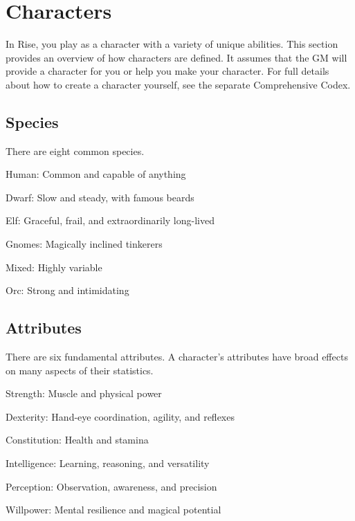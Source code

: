 \chapter{Characters}\label{Characters}

In Rise, you play as a character with a variety of unique abilities.
This section provides an overview of how characters are defined.
It assumes that the GM will provide a character for you or help you make your character.
For full details about how to create a character yourself, see the separate Comprehensive Codex.

\section{Species}
  There are eight common species.
  \begin{raggeditemize}
    \item Human: Common and capable of anything
    \item Dwarf: Slow and steady, with famous beards
    \item Elf: Graceful, frail, and extraordinarily long-lived
    \item Gnomes: Magically inclined tinkerers
    \item Mixed: Highly variable
    \item Orc: Strong and intimidating
  \end{raggeditemize}

\section{Attributes}
  There are six fundamental attributes.
  A character's attributes have broad effects on many aspects of their statistics.
  \begin{raggeditemize}
    \item Strength: Muscle and physical power
    \item Dexterity: Hand-eye coordination, agility, and reflexes
    \item Constitution: Health and stamina
    \item Intelligence: Learning, reasoning, and versatility
    \item Perception: Observation, awareness, and precision
    \item Willpower: Mental resilience and magical potential
  \end{raggeditemize}

